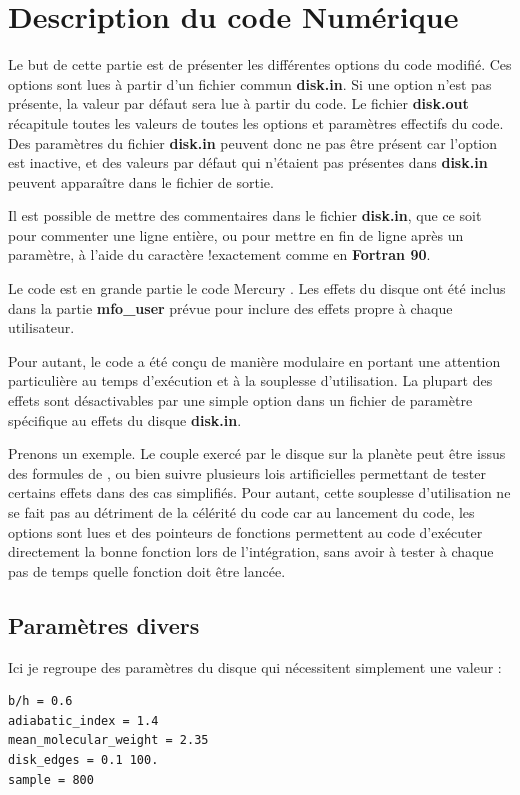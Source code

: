 \chapter{Description du code Numérique}\label{sec:nbody-readme}
Le but de cette partie est de présenter les différentes options du code modifié. Ces options sont lues à partir d'un fichier commun \textbf{disk.in}. Si une option n'est pas présente, la valeur par défaut sera lue à partir du code. Le fichier \textbf{disk.out} récapitule toutes les valeurs de toutes les options et paramètres effectifs du code. Des paramètres du fichier \textbf{disk.in} peuvent donc ne pas être présent car l'option est inactive, et des valeurs par défaut qui n'étaient pas présentes dans \textbf{disk.in} peuvent apparaître dans le fichier de sortie.

Il est possible de mettre des commentaires dans le fichier \textbf{disk.in}, que ce soit pour commenter une ligne entière, ou pour mettre en fin de ligne après un paramètre, à l'aide du caractère \og !\fg exactement comme en \textbf{Fortran 90}.

Le code est en grande partie le code Mercury \cite{chambers1999hybrid}. Les effets du disque ont été inclus dans la partie \textbf{mfo\_user} prévue pour inclure des effets propre à chaque utilisateur. 

Pour autant, le code a été conçu de manière modulaire en portant une attention particulière au temps d'exécution et à la souplesse d'utilisation. La plupart des effets sont désactivables par une simple option dans un fichier de paramètre spécifique au effets du disque \textbf{disk.in}. 

Prenons un exemple. Le couple exercé par le disque sur la planète peut être issus des formules de \cite{paardekooper2011torque}, ou bien suivre plusieurs lois artificielles permettant de tester certains effets dans des cas simplifiés. Pour autant, cette souplesse d'utilisation ne se fait pas au détriment de la célérité du code car au lancement du code, les options sont lues et des pointeurs de fonctions permettent au code d'exécuter directement la bonne fonction lors de l'intégration, sans avoir à tester à chaque pas de temps quelle fonction doit être lancée. 

\section{Paramètres divers}
Ici je regroupe des paramètres du disque qui nécessitent simplement une valeur : 
\begin{verbatim}
b/h = 0.6
adiabatic_index = 1.4
mean_molecular_weight = 2.35
disk_edges = 0.1 100.
sample = 800
\end{verbatim}

